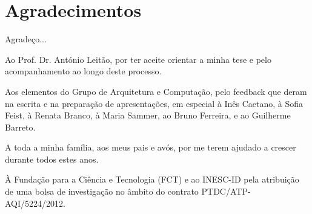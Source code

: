 
\chapter*{Agradecimentos}

Agradeço...

Ao Prof. Dr. António Leitão, por ter aceite orientar a minha tese e pelo acompanhamento ao longo deste processo.

Aos elementos do Grupo de Arquitetura e Computação, pelo feedback que deram na escrita e na preparação de apresentações, em especial à Inês Caetano, à Sofia Feist, à Renata Branco, à Maria Sammer, ao Bruno Ferreira, e ao Guilherme Barreto.

A toda a minha família, aos meus pais e avós, por me terem ajudado a crescer durante todos estes anos.

À Fundação para a Ciência e Tecnologia (FCT) e ao INESC-ID pela atribuição de uma bolsa de investigação no âmbito do contrato PTDC/ATP-AQI/5224/2012.






